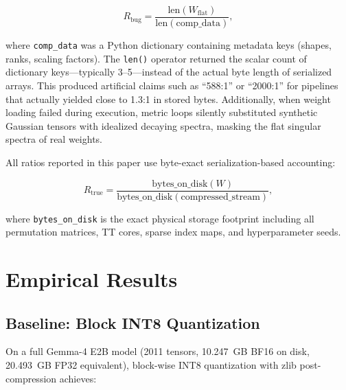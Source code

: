\documentclass[11pt,a4paper]{article}
\begin{document}
\[
	R_{\text{bug}} = \frac{\text{len}(W_{\text{flat}})}{\text{len}(\text{comp\_data})},
\]

where \texttt{comp\_data} was a Python dictionary containing metadata keys (shapes,
ranks, scaling factors). The \texttt{len()} operator returned the scalar count of
dictionary keys---typically 3--5---instead of the actual byte length of serialized
arrays. This produced artificial claims such as ``588:1'' or ``2000:1'' for pipelines
that actually yielded close to 1.3:1 in stored bytes. Additionally, when weight
loading failed during execution, metric loops silently substituted synthetic Gaussian
tensors with idealized decaying spectra, masking the flat singular spectra of real
weights.

All ratios reported in this paper use byte-exact serialization-based accounting:

\[
	R_{\text{true}} = \frac{\text{bytes\_on\_disk}(W)}{\text{bytes\_on\_disk}(\text{compressed\_stream})},
\]

where \texttt{bytes\_on\_disk} is the exact physical storage footprint including
all permutation matrices, TT cores, sparse index maps, and hyperparameter seeds.

\section{Empirical Results}

\subsection{Baseline: Block INT8 Quantization}

On a full Gemma-4 E2B model (2011 tensors, 10.247~GB BF16 on disk, 20.493~GB FP32
equivalent), block-wise INT8 quantization with zlib post-compression achieves:
\end{document}
